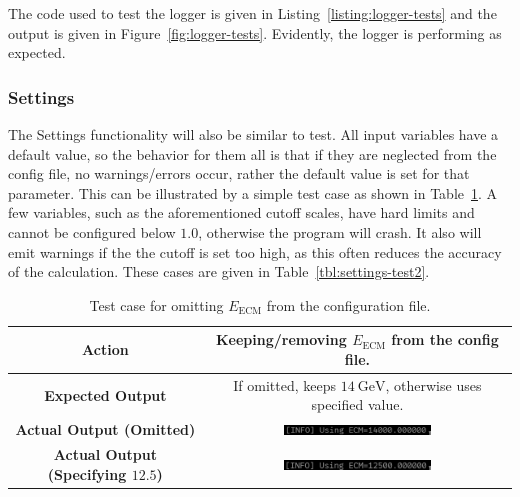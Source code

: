 The code used to test the logger is given in Listing~\ref{listing:logger-tests} and the output is given in Figure~\ref{fig:logger-tests}. Evidently, the logger is performing as expected.

\subsubsection{Settings}

The Settings functionality will also be similar to test. All input variables have a default value, so the behavior for them all is that if they are neglected from the config file, no warnings/errors occur, rather the default value is set for that parameter. This can be illustrated by a simple test case as shown in Table~\ref{tbl:settings-test1}. A few variables, such as the aforementioned cutoff scales, have hard limits and cannot be configured below $1.0$, otherwise the program will crash. It also will emit warnings if the the cutoff is set too high, as this often reduces the accuracy of the calculation. These cases are given in Table~\ref{tbl:settings-test2}.

\begin{table}[ht]
  \centering
  \begin{tabular}{|c|c|}
    \hline
    \textbf{Action} & Keeping/removing $E_{\mathrm{ECM}}$ from the config file. \\ \hline
    \textbf{Expected Output} & If omitted, keeps $\qty{14}{\giga\electronvolt}$, otherwise uses specified value. \\ \hline
    \textbf{Actual Output (Omitted)} & \includegraphics[width=0.5\textwidth]{./res/gfx/settings-test1a.png} \\ \hline
    \textbf{Actual Output (Specifying $12.5$)} & \includegraphics[width=0.5\textwidth]{./res/gfx/settings-test1b.png} \\ \hline
  \end{tabular}
  \caption{Test case for omitting $E_{\mathrm{ECM}}$ from the configuration file.}
  \label{tbl:settings-test1}
\end{table}

